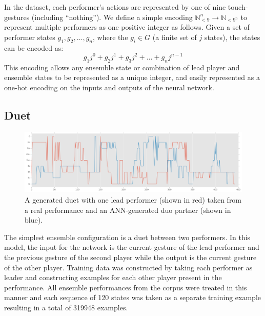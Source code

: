 \documentclass{article}
\begin{document}

In the dataset, each performer's actions are represented by one of
nine touch-gestures (including ``nothing''). We define a simple
encoding $\mathbb{N}_{<9}^n \rightarrow \mathbb{N}_{<9^n}$ to
represent multiple performers as one positive integer as follows.
Given a set of performer states $g_1, g_2, \ldots, g_n$, where the
$g_i \in G$ (a finite set of $j$ states), the states can be
encoded as:
\begin{equation}
g_1j^0 + g_2j^1 + g_3j^2 + \ldots + g_nj^{n-1}
\end{equation}
This encoding allows any ensemble state or combination of lead player
and ensemble states to be represented as a unique integer, and easily
represented as a one-hot encoding on the inputs and outputs of the
neural network.

\subsection{Duet}

\begin{figure}
  \centering
  \includegraphics[width=\textwidth]{duo-test-1}
  \caption{A generated duet with one lead performer (shown in red)
    taken from a real performance and an ANN-generated duo partner
    (shown in blue).}\label{fig:duo-model}
\end{figure}

The simplest ensemble configuration is a duet between two performers.
In this model, the input for the network is the current gesture of the
lead performer and the previous gesture of the second player while the
output is the current gesture of the other player. Training data was
constructed by taking each performer as leader and constructing
examples for each other player present in the performance. All
ensemble performances from the corpus were treated in this manner and
each sequence of 120 states was taken as a separate training example
resulting in a total of 319948 examples.
\end{document}
